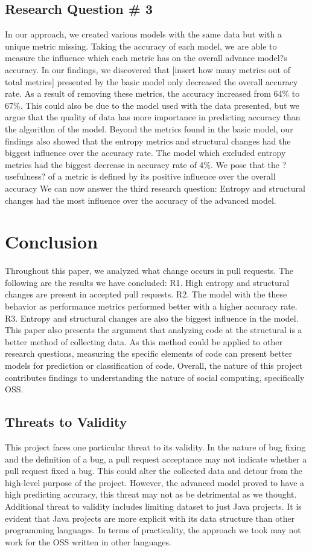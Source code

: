 \documentclass[10pt, conference]{IEEEtran}
\begin{document}
\subsection{Research Question \# 3}
In our approach, we created various models with the same data but with a unique metric missing. Taking the accuracy of each model, we are able to measure the influence which each metric has on the overall advance model?s accuracy. In our findings, we discovered that [insert how many metrics out of total metrics] presented by the basic model only decreased the overall accuracy rate. As a result of removing these metrics, the accuracy increased from 64\% to 67\%. This could also be due to the model used with the data presented, but we argue that the quality of data has more importance in predicting accuracy than the algorithm of the model. Beyond the metrics found in the basic model, our findings also showed that the entropy metrics and structural changes had the biggest influence over the accuracy rate. The model which excluded entropy metrics had the biggest decrease in accuracy rate of 4\%. We pose that the ?usefulness? of a metric is defined by its positive influence over the overall accuracy We can now answer the third research question: Entropy and structural changes had the most influence over the accuracy of the advanced model.

\section{Conclusion}
Throughout this paper, we analyzed what change occurs in pull requests. The following are the results we have concluded:
R1. High entropy and structural changes are present in accepted pull requests.
R2. The model with the these behavior as performance metrics performed better with a higher accuracy rate.
R3. Entropy and structural changes are also the biggest influence in the model.
This paper also presents the argument that analyzing code at the structural is a better method of collecting data. As this method could be applied to other research questions, measuring the specific elements of code can present better models for prediction or classification of code. Overall, the nature of this project contributes findings to understanding the nature of social computing, specifically OSS. 

\subsection{Threats to Validity}
This project faces one particular threat to its validity. In the nature of bug fixing and the definition of a bug, a pull request acceptance may not indicate whether a pull request fixed a bug. This could alter the collected data and detour from the high-level purpose of the project. However, the advanced model proved to have a high predicting accuracy, this threat may not as be detrimental as we thought. Additional threat to validity includes limiting dataset to just Java projects. It is evident that Java projects are more explicit with its data structure than other programming languages. In terms of practicality, the approach we took may not work for the OSS written in other languages.
\end{document}
